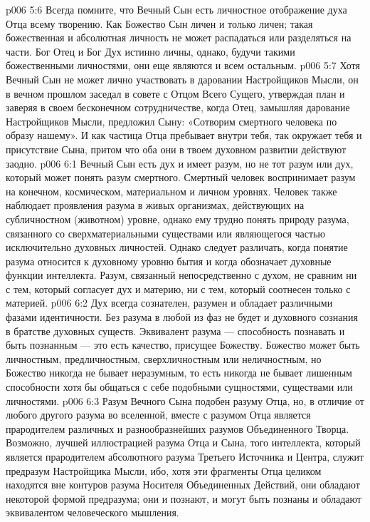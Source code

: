 \vs p006 5:6 Всегда помните, что Вечный Сын есть личностное отображение духа Отца всему творению. Как Божество Сын личен и только личен; такая божественная и абсолютная личность не может распадаться или разделяться на части. Бог Отец и Бог Дух истинно личны, однако, будучи такими божественными личностями, они еще являются и всем остальным.
\vs p006 5:7 Хотя Вечный Сын не может лично участвовать в даровании Настройщиков Мысли, он в вечном прошлом заседал в совете с Отцом Всего Сущего, утверждая план и заверяя в своем бесконечном сотрудничестве, когда Отец, замышляя дарование Настройщиков Мысли, предложил Сыну: «Сотворим смертного человека по образу нашему». И как частица Отца пребывает внутри тебя, так окружает тебя и присутствие Сына, притом что оба они в твоем духовном развитии действуют заодно.
\vs p006 6:1 Вечный Сын есть дух и имеет разум, но не тот разум или дух, который может понять разум смертного. Смертный человек воспринимает разум на конечном, космическом, материальном и личном уровнях. Человек также наблюдает проявления разума в живых организмах, действующих на субличностном (животном) уровне, однако ему трудно понять природу разума, связанного со сверхматериальными существами или являющегося частью исключительно духовных личностей. Однако следует различать, когда понятие разума относится к духовному уровню бытия и когда обозначает духовные функции интеллекта. Разум, связанный непосредственно с духом, не сравним ни с тем, который согласует дух и материю, ни с тем, который соотнесен только с материей.
\vs p006 6:2 Дух всегда сознателен, разумен и обладает различными фазами идентичности. Без разума в любой из фаз не будет и духовного сознания в братстве духовных существ. Эквивалент разума --- способность познавать и быть познанным --- это есть качество, присущее Божеству. Божество может быть личностным, предличностным, сверхличностным или неличностным, но Божество никогда не бывает неразумным, то есть никогда не бывает лишенным способности хотя бы общаться с себе подобными сущностями, существами или личностями.
\vs p006 6:3 Разум Вечного Сына подобен разуму Отца, но, в отличие от любого другого разума во вселенной, вместе с разумом Отца является прародителем различных и разнообразнейших разумов Объединенного Творца. Возможно, лучшей иллюстрацией разума Отца и Сына, того интеллекта, который является прародителем абсолютного разума Третьего Источника и Центра, служит предразум Настройщика Мысли, ибо, хотя эти фрагменты Отца целиком находятся вне контуров разума Носителя Объединенных Действий, они обладают некоторой формой предразума; они и познают, и могут быть познаны и обладают эквивалентом человеческого мышления.
